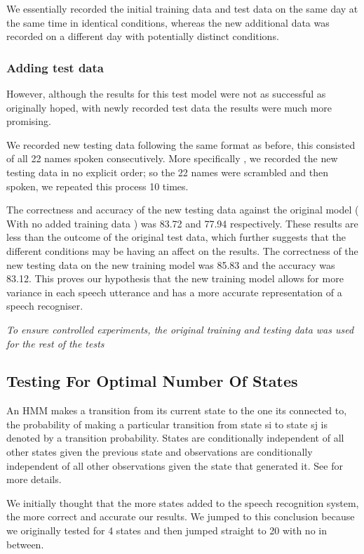 \documentclass[	DIV=calc,%
							paper=a4,%
							fontsize=9.8pt,%
							twocolumn]{scrartcl}	 					%
\begin{document}
  We essentially recorded the initial training data and test data on the same day at the same time in identical conditions, whereas the new additional data was recorded on a different day with potentially distinct conditions.
 
 \subsubsection{Adding test data}
 However, although the results for this test model were not as successful as originally hoped, with newly recorded test data the results were much more promising. 
 
 We recorded new testing data following the same format as before,
 this consisted of all 22 names spoken consecutively. More specifically , we recorded the new testing data in no explicit order; so the 22 names were scrambled and then spoken, we repeated this process 10 times.
 
 The correctness and accuracy of the new testing data against the original model ( With no added training data ) was 83.72 and 77.94 respectively. These results are less than the outcome of the original test data, which further suggests that the different conditions may be having an affect on the results. The correctness of the new testing data on the new training model was 85.83 and the accuracy was 83.12. This proves our hypothesis that the new training model allows for more variance in each speech utterance and has a more accurate representation of a speech recogniser.
 
 \textit{To ensure controlled experiments, the original training and testing data was used for the rest of the tests}
 
 


\subsection{Testing For Optimal Number Of States}
An HMM makes a transition from its current state to the one its connected to,
the probability of making a particular transition from state si to state sj is denoted by 
a transition probability. States are conditionally independent of all other states given the previous state and observations are conditionally independent of all other observations given the state that generated it. See \cite{DBLP:journals/ftsig/GalesY07} for more details.

We initially thought that the more states added to the speech recognition system, the more correct and accurate our results. We jumped to this conclusion because we originally tested for 4 states and then jumped straight to 20 with no in between.
\end{document}
